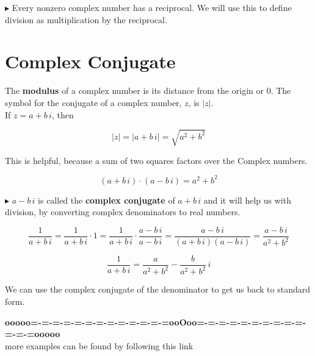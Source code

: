 \documentclass{ximera}
\begin{document}
$\blacktriangleright$  Every nonzero complex number has a reciprocal.  We will use this to define division as multiplication by the reciprocal.





\section{Complex Conjugate}


The \textbf{modulus} of a complex number is its distance from the origin or $0$.  The symbol for the conjugate of a complex number, $z$, is $|z|$.  \\

If $z = a + b \, i$, then

\[    |z| = |a + b \, i| = \sqrt{a^2 + b^2}          \]



This is helpful, because a sum of two squares factors over the Complex numbers.



\[   (a + b \, i) \cdot    (a - b \, i)  = a^2 + b^2   \]



$\blacktriangleright$  $a - b \, i$ is called the \textbf{complex conjugate} of $a + b \, i$ and it will help us with division, by converting complex denominators to real numbers.




\[   \frac{1}{a + b \, i} =   \frac{1}{a + b \, i} \cdot 1 = \frac{1}{a + b \, i} \cdot \frac{a - b \, i}{a - b \, i}  =  \frac{a - b \, i}{(a + b \, i)(a - b \, i)} =   \frac{a - b \, i}{a^2 + b^2}  \]


\[  \frac{1}{a + b \, i}   =  \frac{a}{a^2 + b^2} - \frac{b}{a^2 + b^2} \, i      \]


We can use the complex conjugate of the denominator to get us back to standard form.















\begin{center}
\textbf{\textcolor{green!50!black}{ooooo=-=-=-=-=-=-=-=-=-=-=-=-=ooOoo=-=-=-=-=-=-=-=-=-=-=-=-=ooooo}} \\

more examples can be found by following this link\\ 

\end{center}
\end{document}
